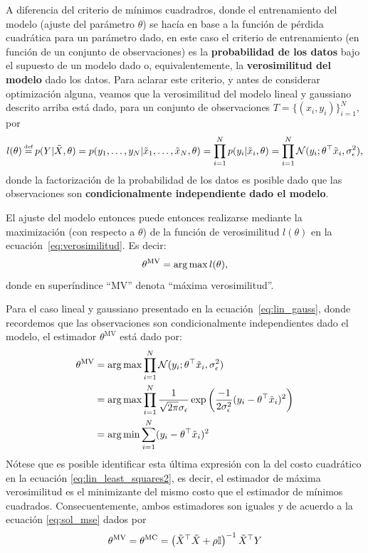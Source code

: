 A diferencia del criterio de mínimos cuadradros, donde el entrenamiento del modelo (ajuste del parámetro $\theta$) se hacía en base a la función de pérdida cuadrática para un parámetro dado, en este caso el criterio de entrenamiento (en función de un conjunto de observaciones) es la \textbf{probabilidad de los datos} bajo el supuesto de un modelo dado o, equivalentemente, la \textbf{verosimilitud del modelo} dado los datos. Para aclarar este criterio, y antes de considerar optimización alguna, veamos que la verosimilitud del modelo lineal y gaussiano descrito arriba está dado, para un conjunto de observaciones $T=\{(x_i,y_i)\}_{i=1}^N$, por 
\begin{equation}
	l(\theta) \deq p(Y|\tX,\theta) = p(y_1,\ldots,y_N|\tx_1,\ldots,\tx_N,\theta)= \prod_{i=1}^Np(y_i|\tx_i,\theta) = \prod_{i=1}^N \cN(y_i;\theta^\top\tx_i,\sigma_\epsilon^2), \label{eq:verosimilitud}
\end{equation} 
donde la factorización de la probabilidad de los datos es posible dado que las observaciones son \textbf{condicionalmente independiente dado el modelo}.

El ajuste del modelo entonces puede entonces realizarse mediante la maximización (con respecto a $\theta$) de la función de verosimilitud $l(\theta)$ en la ecuación~\eqref{eq:verosimilitud}. Es decir: 
\begin{equation}
	\theta^{\text{MV}}= \operatorname*{arg\,max} l(\theta),
\end{equation}
donde en superíndince ``MV'' denota ``máxima verosimilitud''. 

Para el caso lineal y gaussiano presentado en la ecuación~\eqref{eq:lin_gauss}, donde recordemos que las observaciones son condicionalmente independientes dado el modelo, el estimador $\theta^{\text{MV}}$ está dado por:
\begin{align}
	\theta^{\text{MV}} 	&= \operatorname*{arg\,max} \prod_{i=1}^N {\mathcal N}(y_i;\theta^\top\tilde{x}_i,\sigma_\epsilon^2) \label{eq:theta_ML}\\
						&= \operatorname*{arg\,max} \prod_{i=1}^N \frac{1}{\sqrt{2\pi}\sigma_\epsilon} \exp\left({\frac{-1}{2\sigma_\epsilon^2}(y_i-\theta^\top\tilde{x}_i)^2}\right) \nonumber\\
						&= \operatorname*{arg\,min} \sum_{i=1}^N (y_i-\theta^\top\tilde{x}_i)^2 \nonumber
\end{align}
Nótese que es posible identificar esta última expresión con la del costo cuadrático en la ecuación \eqref{eq:lin_least_squares2}, es decir, el estimador de máxima verosimilitud es el minimizante del mismo costo que el estimador de mínimos cuadrados. Consecuentemente, ambos estimadores son iguales y de acuerdo a la ecuación \eqref{eq:sol_mse} dados por 
\begin{equation}
	\theta^{\text{MV}} = \theta^{\text{MC}} = \left(\tilde{X}^\top\tilde{X} +\rho {\mathbb I}\right)^{-1} \tilde{X}^\top Y 
\end{equation}

